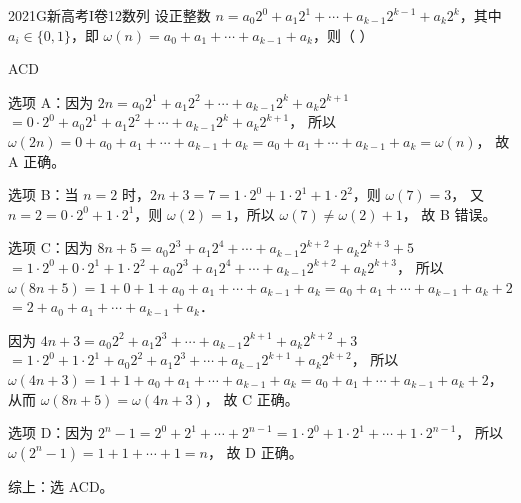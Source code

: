 
\begin{problem}{2021}{G}{新高考I卷}{12}{数列}
设正整数 $n = a_0 2^0 + a_1 2^1 + \cdots + a_{k-1} 2^{k-1} + a_k 2^k$，其中 $a_i \in \{0,1\}$，即 $\omega(n) = a_0 + a_1 + \cdots + a_{k-1} + a_k$，则（ \hspace{1cm}）

\begin{choices}
\end{choices}
\end{problem}

\begin{answer}
ACD
\end{answer}


\begin{solutions}
选项 A：因为 $2n = a_0 2^1 + a_1 2^2 + \cdots + a_{k-1} 2^k + a_k 2^{k+1}$  
$= 0 \cdot 2^0 + a_0 2^1 + a_1 2^2 + \cdots + a_{k-1} 2^k + a_k 2^{k+1}$，  
所以 $\omega(2n) = 0 + a_0 + a_1 + \cdots + a_{k-1} + a_k = a_0 + a_1 + \cdots + a_{k-1} + a_k = \omega(n)$，  
故 A 正确。

选项 B：当 $n = 2$ 时，$2n + 3 = 7 = 1 \cdot 2^0 + 1 \cdot 2^1 + 1 \cdot 2^2$，则 $\omega(7) = 3$，  
又 $n = 2 = 0 \cdot 2^0 + 1 \cdot 2^1$，则 $\omega(2) = 1$，所以 $\omega(7) \ne \omega(2) + 1$，  
故 B 错误。

选项 C：因为 $8n + 5 = a_0 2^3 + a_1 2^4 + \cdots + a_{k-1} 2^{k+2} + a_k 2^{k+3} + 5$  
$= 1 \cdot 2^0 + 0 \cdot 2^1 + 1 \cdot 2^2 + a_0 2^3 + a_1 2^4 + \cdots + a_{k-1} 2^{k+2} + a_k 2^{k+3}$，  
所以 $\omega(8n+5) = 1 + 0 + 1 + a_0 + a_1 + \cdots + a_{k-1} + a_k = a_0 + a_1 + \cdots + a_{k-1} + a_k + 2$  
$= 2 + a_0 + a_1 + \cdots + a_{k-1} + a_k$．

因为 $4n + 3 = a_0 2^2 + a_1 2^3 + \cdots + a_{k-1} 2^{k+1} + a_k 2^{k+2} + 3$  
$= 1 \cdot 2^0 + 1 \cdot 2^1 + a_0 2^2 + a_1 2^3 + \cdots + a_{k-1} 2^{k+1} + a_k 2^{k+2}$，  
所以 $\omega(4n+3) = 1 + 1 + a_0 + a_1 + \cdots + a_{k-1} + a_k = a_0 + a_1 + \cdots + a_{k-1} + a_k + 2$，  
从而 $\omega(8n+5) = \omega(4n+3)$，  
故 C 正确。

选项 D：因为 $2^n - 1 = 2^0 + 2^1 + \cdots + 2^{n-1} = 1 \cdot 2^0 + 1 \cdot 2^1 + \cdots + 1 \cdot 2^{n-1}$，  
所以 $\omega(2^n - 1) = 1 + 1 + \cdots + 1 = n$，  
故 D 正确。

综上：选 ACD。
\end{solutions}